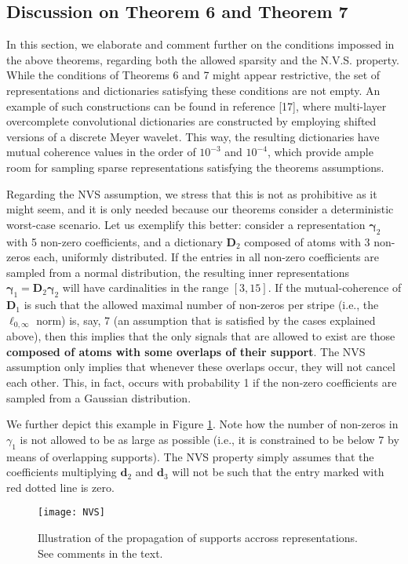 \documentclass[10pt,journal]{IEEEtran}
\def\d{{\mathbf d}}
\def\D{{\mathbf D}}
\def\gama{{\boldsymbol \gamma}}
\theoremstyle{plain}
\theoremstyle{definition}
\begin{document}
\subsection{Discussion on Theorem 6 and Theorem 7}
\label{app:DiscussionNVS}
In this section, we elaborate and comment further on the conditions impossed in the above theorems, regarding both the allowed sparsity and the N.V.S. property.
While the conditions of Theorems 6 and 7 might appear restrictive, the set of representations and dictionaries satisfying these conditions are not empty. An example of such constructions can be found in reference [17], where multi-layer overcomplete convolutional dictionaries are constructed by employing shifted versions of a discrete Meyer wavelet. This way, the resulting dictionaries have mutual coherence values in the order of $10^{-3}$ and $10^{-4}$, which provide ample room for sampling sparse representations satisfying the theorems assumptions. 

Regarding the NVS assumption, we stress that this is not as prohibitive as it might seem, and it is only needed because our theorems consider a deterministic worst-case scenario. Let us exemplify this better: consider a representation $\gama_2$ with 5 non-zero coefficients, and a dictionary $\D_2$ composed of atoms with 3 non-zeros each, uniformly distributed. If the entries in all non-zero coefficients are sampled from a normal distribution, the resulting inner representations $\gama_1 = \D_2\gama_2$ will have cardinalities in the range $[3, 15]$. If the mutual-coherence of $\D_1$ is such that the allowed maximal number of non-zeros per stripe (i.e., the $\ell_{0,\infty}$ norm) is, say, 7 (an assumption that is satisfied by the cases explained above), then this implies that the only signals that are allowed to exist are those \textbf{composed of atoms with some overlaps of their support}. The NVS assumption only implies that whenever these overlaps occur, they will not cancel each other. This, in fact, occurs with probability 1 if the non-zero coefficients are sampled from a Gaussian distribution.

We further depict this example in Figure \ref{app:Fig_NVS}. Note how the number of non-zeros in $\gamma_1$ is not allowed to be as large as possible (i.e., it is constrained to be below 7 by means of overlapping supports). The NVS property simply assumes that the coefficients multiplying $\d_2$ and $\d_3$ will not be such that the entry marked with red dotted line is zero. 

\begin{figure}[h]
	\centering
	\texttt{[image: NVS]}
	\caption{Illustration of the propagation of supports accross representations. See comments in the text.}
	\label{app:Fig_NVS}
\end{figure}
\end{document}
